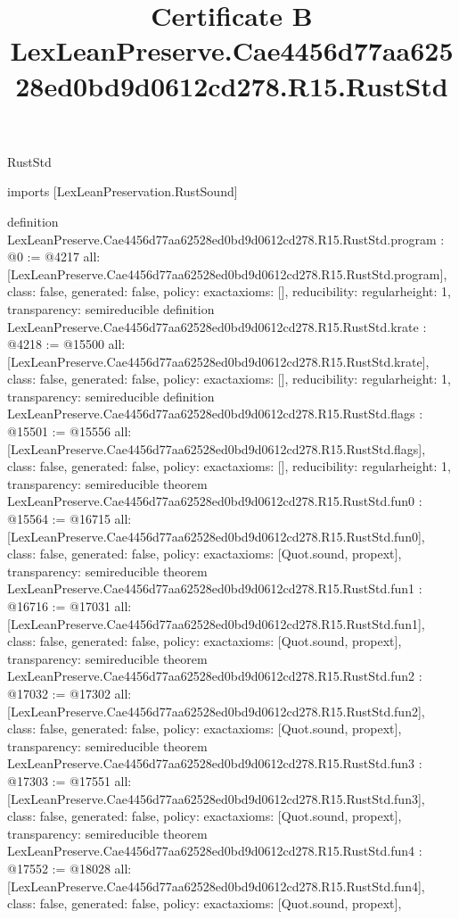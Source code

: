 \begin{lexlean}{RustStd}
\title{Certificate B LexLeanPreserve.Cae4456d77aa62528ed0bd9d0612cd278.R15.RustStd}
\begin{coremodule}
imports [LexLeanPreservation.RustSound]

definition LexLeanPreserve.Cae4456d77aa62528ed0bd9d0612cd278.R15.RustStd.program : @0 := @4217 {
  all: [LexLeanPreserve.Cae4456d77aa62528ed0bd9d0612cd278.R15.RustStd.program],
  class: false,
  generated: false,
  policy: exact{axioms: []},
  reducibility: regular{height: 1},
  transparency: semireducible
}
definition LexLeanPreserve.Cae4456d77aa62528ed0bd9d0612cd278.R15.RustStd.krate : @4218 := @15500 {
  all: [LexLeanPreserve.Cae4456d77aa62528ed0bd9d0612cd278.R15.RustStd.krate],
  class: false,
  generated: false,
  policy: exact{axioms: []},
  reducibility: regular{height: 1},
  transparency: semireducible
}
definition LexLeanPreserve.Cae4456d77aa62528ed0bd9d0612cd278.R15.RustStd.flags : @15501 := @15556 {
  all: [LexLeanPreserve.Cae4456d77aa62528ed0bd9d0612cd278.R15.RustStd.flags],
  class: false,
  generated: false,
  policy: exact{axioms: []},
  reducibility: regular{height: 1},
  transparency: semireducible
}
theorem LexLeanPreserve.Cae4456d77aa62528ed0bd9d0612cd278.R15.RustStd.fun0 : @15564 := @16715 {
  all: [LexLeanPreserve.Cae4456d77aa62528ed0bd9d0612cd278.R15.RustStd.fun0],
  class: false,
  generated: false,
  policy: exact{axioms: [Quot.sound, propext]},
  transparency: semireducible
}
theorem LexLeanPreserve.Cae4456d77aa62528ed0bd9d0612cd278.R15.RustStd.fun1 : @16716 := @17031 {
  all: [LexLeanPreserve.Cae4456d77aa62528ed0bd9d0612cd278.R15.RustStd.fun1],
  class: false,
  generated: false,
  policy: exact{axioms: [Quot.sound, propext]},
  transparency: semireducible
}
theorem LexLeanPreserve.Cae4456d77aa62528ed0bd9d0612cd278.R15.RustStd.fun2 : @17032 := @17302 {
  all: [LexLeanPreserve.Cae4456d77aa62528ed0bd9d0612cd278.R15.RustStd.fun2],
  class: false,
  generated: false,
  policy: exact{axioms: [Quot.sound, propext]},
  transparency: semireducible
}
theorem LexLeanPreserve.Cae4456d77aa62528ed0bd9d0612cd278.R15.RustStd.fun3 : @17303 := @17551 {
  all: [LexLeanPreserve.Cae4456d77aa62528ed0bd9d0612cd278.R15.RustStd.fun3],
  class: false,
  generated: false,
  policy: exact{axioms: [Quot.sound, propext]},
  transparency: semireducible
}
theorem LexLeanPreserve.Cae4456d77aa62528ed0bd9d0612cd278.R15.RustStd.fun4 : @17552 := @18028 {
  all: [LexLeanPreserve.Cae4456d77aa62528ed0bd9d0612cd278.R15.RustStd.fun4],
  class: false,
  generated: false,
  policy: exact{axioms: [Quot.sound, propext]},
}
\end{coremodule}
\end{lexlean}
